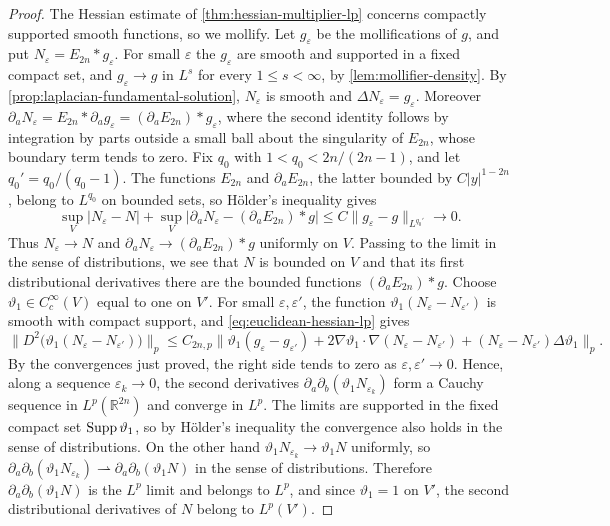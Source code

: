 \begin{proof}
The Hessian estimate of \cref{thm:hessian-multiplier-lp} concerns compactly supported smooth functions, so we mollify. Let $g_\varepsilon$ be the mollifications of $g$, and put $N_\varepsilon=E_{2n}*g_\varepsilon$. For small $\varepsilon$ the $g_\varepsilon$ are smooth and supported in a fixed compact set, and $g_\varepsilon\to g$ in $L^s$ for every $1\leq s<\infty$, by \cref{lem:mollifier-density}. By \cref{prop:laplacian-fundamental-solution}, $N_\varepsilon$ is smooth and $\Delta N_\varepsilon=g_\varepsilon$. Moreover $\partial_a N_\varepsilon=E_{2n}*\partial_ag_\varepsilon=(\partial_aE_{2n})*g_\varepsilon$, where the second identity follows by integration by parts outside a small ball about the singularity of $E_{2n}$, whose boundary term tends to zero. Fix $q_0$ with $1<q_0<2n/(2n-1)$, and let $q_0'=q_0/(q_0-1)$. The functions $E_{2n}$ and $\partial_aE_{2n}$, the latter bounded by $C|y|^{1-2n}$, belong to $L^{q_0}$ on bounded sets, so H\"older's inequality gives
\[
 \sup_V|N_\varepsilon-N|+\sup_V\bigl|\partial_aN_\varepsilon-(\partial_aE_{2n})*g\bigr|
   \leq C\|g_\varepsilon-g\|_{L^{q_0'}}\longrightarrow0.
\]
Thus $N_\varepsilon\to N$ and $\partial_aN_\varepsilon\to(\partial_aE_{2n})*g$ uniformly on $V$. Passing to the limit in the sense of distributions, we see that $N$ is bounded on $V$ and that its first distributional derivatives there are the bounded functions $(\partial_aE_{2n})*g$. Choose $\vartheta_1\in C^\infty_c(V)$ equal to one on $V'$. For small $\varepsilon,\varepsilon'$, the function $\vartheta_1(N_\varepsilon-N_{\varepsilon'})$ is smooth with compact support, and \eqref{eq:euclidean-hessian-lp} gives
\[
 \bigl\|D^2\bigl(\vartheta_1(N_\varepsilon-N_{\varepsilon'})\bigr)\bigr\|_p
 \leq C_{2n,p}\bigl\|\vartheta_1(g_\varepsilon-g_{\varepsilon'})
   +2\nabla\vartheta_1\cdot\nabla(N_\varepsilon-N_{\varepsilon'})
   +(N_\varepsilon-N_{\varepsilon'})\Delta\vartheta_1\bigr\|_p.
\]
By the convergences just proved, the right side tends to zero as $\varepsilon,\varepsilon'\to0$. Hence, along a sequence $\varepsilon_k\to0$, the second derivatives $\partial_a\partial_b(\vartheta_1N_{\varepsilon_k})$ form a Cauchy sequence in $L^p(\mathbb R^{2n})$ and converge in $L^p$. The limits are supported in the fixed compact set $\operatorname{Supp}\vartheta_1$, so by H\"older's inequality the convergence also holds in the sense of distributions. On the other hand $\vartheta_1N_{\varepsilon_k}\to\vartheta_1N$ uniformly, so $\partial_a\partial_b(\vartheta_1N_{\varepsilon_k})\rightharpoonup\partial_a\partial_b(\vartheta_1N)$ in the sense of distributions. Therefore $\partial_a\partial_b(\vartheta_1N)$ is the $L^p$ limit and belongs to $L^p$, and since $\vartheta_1=1$ on $V'$, the second distributional derivatives of $N$ belong to $L^p(V')$.


\end{proof}
